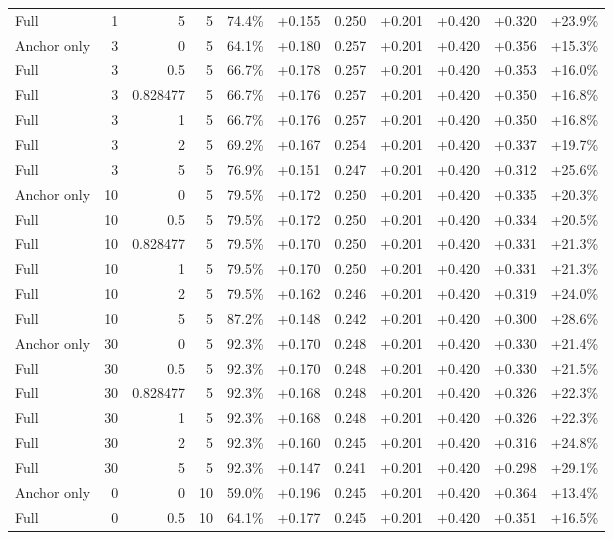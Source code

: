 \begin{table}[htbp]
\begin{tabular}{lrrrccccccc}
Full & 1 & 5 & 5 & 74.4\% & +0.155 & 0.250 & +0.201 & +0.420 & +0.320 & +23.9\% \\
Anchor only & 3 & 0 & 5 & 64.1\% & +0.180 & 0.257 & +0.201 & +0.420 & +0.356 & +15.3\% \\
Full & 3 & 0.5 & 5 & 66.7\% & +0.178 & 0.257 & +0.201 & +0.420 & +0.353 & +16.0\% \\
Full & 3 & 0.828477 & 5 & 66.7\% & +0.176 & 0.257 & +0.201 & +0.420 & +0.350 & +16.8\% \\
Full & 3 & 1 & 5 & 66.7\% & +0.176 & 0.257 & +0.201 & +0.420 & +0.350 & +16.8\% \\
Full & 3 & 2 & 5 & 69.2\% & +0.167 & 0.254 & +0.201 & +0.420 & +0.337 & +19.7\% \\
Full & 3 & 5 & 5 & 76.9\% & +0.151 & 0.247 & +0.201 & +0.420 & +0.312 & +25.6\% \\
Anchor only & 10 & 0 & 5 & 79.5\% & +0.172 & 0.250 & +0.201 & +0.420 & +0.335 & +20.3\% \\
Full & 10 & 0.5 & 5 & 79.5\% & +0.172 & 0.250 & +0.201 & +0.420 & +0.334 & +20.5\% \\
Full & 10 & 0.828477 & 5 & 79.5\% & +0.170 & 0.250 & +0.201 & +0.420 & +0.331 & +21.3\% \\
Full & 10 & 1 & 5 & 79.5\% & +0.170 & 0.250 & +0.201 & +0.420 & +0.331 & +21.3\% \\
Full & 10 & 2 & 5 & 79.5\% & +0.162 & 0.246 & +0.201 & +0.420 & +0.319 & +24.0\% \\
Full & 10 & 5 & 5 & 87.2\% & +0.148 & 0.242 & +0.201 & +0.420 & +0.300 & +28.6\% \\
Anchor only & 30 & 0 & 5 & 92.3\% & +0.170 & 0.248 & +0.201 & +0.420 & +0.330 & +21.4\% \\
Full & 30 & 0.5 & 5 & 92.3\% & +0.170 & 0.248 & +0.201 & +0.420 & +0.330 & +21.5\% \\
Full & 30 & 0.828477 & 5 & 92.3\% & +0.168 & 0.248 & +0.201 & +0.420 & +0.326 & +22.3\% \\
Full & 30 & 1 & 5 & 92.3\% & +0.168 & 0.248 & +0.201 & +0.420 & +0.326 & +22.3\% \\
Full & 30 & 2 & 5 & 92.3\% & +0.160 & 0.245 & +0.201 & +0.420 & +0.316 & +24.8\% \\
Full & 30 & 5 & 5 & 92.3\% & +0.147 & 0.241 & +0.201 & +0.420 & +0.298 & +29.1\% \\
Anchor only & 0 & 0 & 10 & 59.0\% & +0.196 & 0.245 & +0.201 & +0.420 & +0.364 & +13.4\% \\
Full & 0 & 0.5 & 10 & 64.1\% & +0.177 & 0.245 & +0.201 & +0.420 & +0.351 & +16.5\% \\

\end{tabular}
\end{table}
